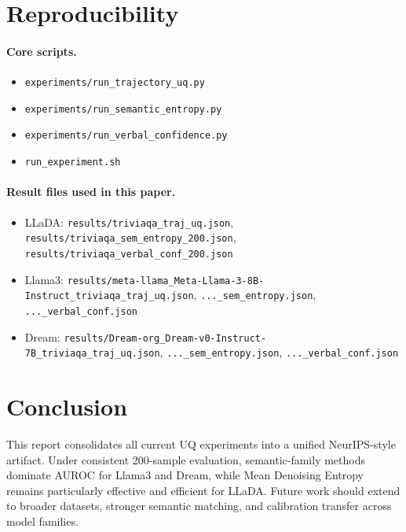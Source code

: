 \documentclass{article}
\begin{document}
\section{Reproducibility}
\paragraph{Core scripts.}
\begin{itemize}
\item \texttt{experiments/run\_trajectory\_uq.py}
\item \texttt{experiments/run\_semantic\_entropy.py}
\item \texttt{experiments/run\_verbal\_confidence.py}
\item \texttt{run\_experiment.sh}
\end{itemize}

\paragraph{Result files used in this paper.}
\begin{itemize}
\item LLaDA: \texttt{results/triviaqa\_traj\_uq.json}, \texttt{results/triviaqa\_sem\_entropy\_200.json}, \texttt{results/triviaqa\_verbal\_conf\_200.json}
\item Llama3: \texttt{results/meta-llama\_Meta-Llama-3-8B-Instruct\_triviaqa\_traj\_uq.json}, \texttt{...\_sem\_entropy.json}, \texttt{...\_verbal\_conf.json}
\item Dream: \texttt{results/Dream-org\_Dream-v0-Instruct-7B\_triviaqa\_traj\_uq.json}, \texttt{...\_sem\_entropy.json}, \texttt{...\_verbal\_conf.json}
\end{itemize}

\section{Conclusion}
This report consolidates all current UQ experiments into a unified NeurIPS-style artifact. Under consistent 200-sample evaluation, semantic-family methods dominate AUROC for Llama3 and Dream, while Mean Denoising Entropy remains particularly effective and efficient for LLaDA. Future work should extend to broader datasets, stronger semantic matching, and calibration transfer across model families.
\end{document}
